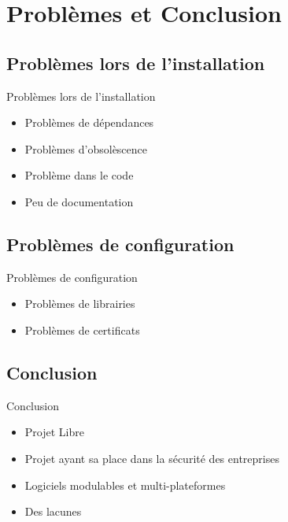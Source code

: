 \documentclass[t,12pt]{beamer}
\begin{document}
\section{Problèmes et Conclusion}                                                    %
	\subsection{Problèmes lors de l'installation}
		\begin{frame}{Problèmes lors de l'installation}                    %
		\begin{itemize}
			\item Problèmes de dépendances
			\newline
			\item Problèmes d'obsolèscence
			\newline		
			\item Problème dans le code
			\newline
			\item Peu de documentation
		\end{itemize}
		\end{frame}

	\subsection{Problèmes de configuration}
		\begin{frame}{Problèmes de configuration}                        %
		\begin{itemize}
			\item Problèmes de librairies
			\newline
			\newline
			\item Problèmes de certificats
		\end{itemize}
		\end{frame}


	\subsection{Conclusion}
		\begin{frame}{Conclusion}                                                         %
		\begin{itemize}
			\item Projet Libre
			\newline
			\item Projet ayant sa place dans la sécurité des entreprises
			\newline
			\item Logiciels modulables et multi-plateformes
			\newline
			\item Des lacunes 
		\end{itemize}
		\end{frame}
\end{document}
